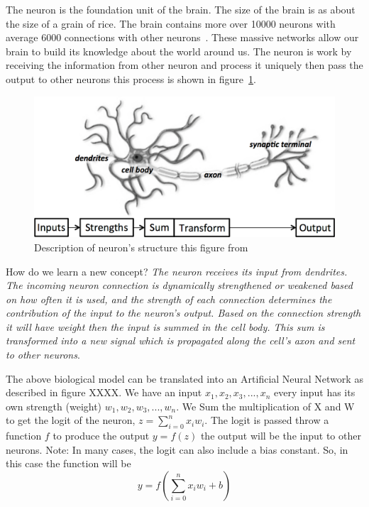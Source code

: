  The neuron is the foundation unit of the brain. The size of the brain is as about the size of a grain of rice. The brain contains more over 10000 neurons with average 6000 connections with other neurons~\cite{Restak_2001}.  These massive networks allow our brain to build its knowledge about the world around us. The neuron is work by receiving the information from other neuron and process it uniquely then pass the output to other neurons this process is shown in figure~\ref{fig:Neuron_Structure}.%
 \begin{figure}[!t] \includegraphics[width=\linewidth]{./Figures/Ch_2_Background/neuron_structure.png}
  \caption{Description of neuron's structure this figure from~\cite{DLFundamentals}}
  \label{fig:Neuron_Structure}
\end{figure}%
 How do we learn a new concept? \textit{The neuron receives its input from dendrites. The incoming neuron connection is dynamically strengthened or weakened based on how often it is used, and the strength of each connection determines the contribution of the input to the neuron's output. Based on the connection strength it will have weight then the input is summed in the cell body. This sum is transformed into a new signal which is propagated along the cell's axon and sent to other neurons\cite{DLFundamentals}}.

 The above biological model can be translated into an Artificial Neural Network as described in figure XXXX. %
 We have an input $x_1,x_2,x_3,...,x_n$ every input has its own strength (weight) $w_1,w_2,w_3,...,w_n$. We Sum the multiplication of X and W to get the logit of the neuron, $z =  \sum_{i=0}^{n} x_i w_i $. The logit is passed throw a function $f$ to produce the output $ y = f(z)$ the output will be the input to other neurons. Note: In many cases, the logit can also include a bias constant. So, in this case the function will be $$ y = f(\sum_{i=0}^{n} x_i w_i + b)$$
 
